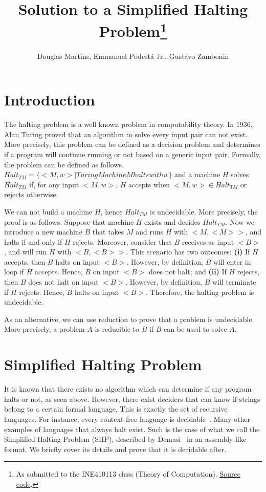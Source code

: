 \documentclass[12pt]{article}
\title{Solution to a Simplified Halting Problem\footnote{
    As submitted to the INE410113 class (Theory of Computation). \href{https://github.com/zambonin/ine410113}{Source code}.}}
\author{Douglas Martins\inst{1}, Emmanuel Podestá Jr.\inst{1}, Gustavo Zambonin\inst{1}}
\begin{document}
 

\maketitle

\section{Introduction}\label{sec:intro}

The halting problem is a well known problem in computability theory. In 1936, Alan Turing proved that an algorithm to solve every input pair can not exist. More precisely, this problem can be defined as a decision problem and determines if a program will continue running or not based on a generic input pair. Formally, the problem can be defined as follows. $Halt_{TM} = \{<M, w> | Turing Machine M halts with w\}$ and a machine $H$ solves $Halt_{TM}$ if, for any input $<M,w>$, $H$ accepts when $<M,w> \in Halt_{TM}$ or rejects otherwise. 

We can not build a machine $H$, hence $Halt_{TM}$ is undecidable. More precisely, the proof is as follows. Suppose that machine $H$ exists and decides $Halt_{TM}$. Now we introduce a new machine $B$ that takes $M$ and runs $H$ with $<M, <M>>$, and halts if and only if $H$ rejects. Moreover, consider that $B$ receives as input $<B>$, and will run $H$ with $<B, <B>>$. This scenario has two outcomes: \textbf{(i)} If $H$ accepts, then $B$ halts on input $<B>$. However, by definition, $B$ will enter in loop if $H$ accepts. Hence, $B$ on input $<B>$ does not halt; and \textbf{(ii)} If $H$ rejects, then $B$ does not halt on input $<B>$. However, by definition, $B$ will terminate if $H$ rejects. Hence, $B$ halts on input $<B>$. Therefore, the halting problem is undecidable.

As an alternative, we can use reduction to prove that a problem is undecidable. More precisely, a problem $A$ is reducible to $B$ if $B$ can be used to solve $A$.

\section{Simplified Halting Problem}\label{sec:halting}

It is known that there exists no algorithm which can determine if any program halts or not, as seen above. However, there exist deciders that can know if strings belong to a certain formal language. This is exactly the set of recursive languages. For instance, every context-free language is decidable~\cite[Theorem 4.9]{Sipser:book:2012}. Many other examples of languages that always halt exist. Such is the case of what we call the Simplified Halting Problem (SHP), described by Demasi~\cite{Demasi:misc:2013:may} in an assembly-like format. We briefly cover its details and prove that it is decidable after.
\end{document}
